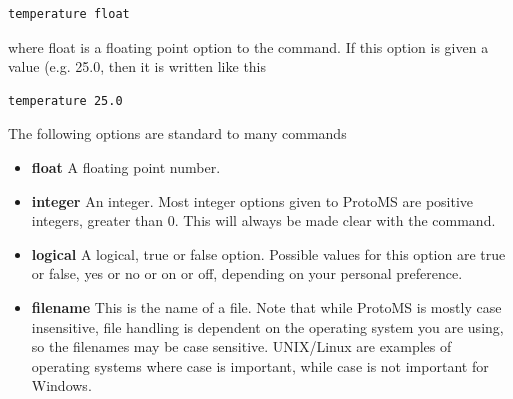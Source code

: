 \documentclass[letterpaper,10pt,english]{sphinxmanual}
\begin{document}
\begin{Verbatim}[commandchars=\\\{\}]
temperature float
\end{Verbatim}

where float is a floating point option to the command. If this option is given a value (e.g. 25.0, then it is written like this

\begin{Verbatim}[commandchars=\\\{\}]
temperature 25.0
\end{Verbatim}

The following options are standard to many commands
\begin{itemize}
\item {} 
\textbf{float} A floating point number.

\item {} 
\textbf{integer} An integer. Most integer options given to ProtoMS are positive integers, greater than 0. This will always be made clear with the command.

\item {} 
\textbf{logical} A logical, true or false option. Possible values for this option are true or false, yes or no or on or off, depending on your personal preference.

\item {} 
\textbf{filename} This is the name of a file. Note that while ProtoMS is mostly case insensitive, file handling is dependent on the operating system you are using, so the filenames may be case sensitive. UNIX/Linux are examples of operating systems where case is important, while case is not important for Windows.

\end{itemize}
\end{document}
